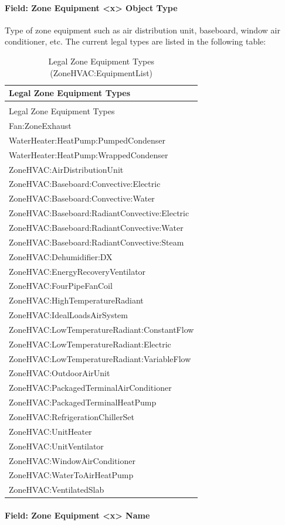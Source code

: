 \paragraph{Field: Zone Equipment \textless{}x\textgreater{} Object Type}\label{field-zone-equipment-x-object-type}

Type of zone equipment such as air distribution unit, baseboard, window air conditioner, etc. The current legal types are listed in the following table:

\begin{longtable}[c]{@{}l@{}}
\caption{Legal Zone Equipment Types (ZoneHVAC:EquipmentList) \label{table:legal-zone-equipment-types-zonehvac}} \tabularnewline
\toprule
Legal Zone Equipment Types \tabularnewline
\midrule
\endfirsthead

\caption[]{Legal Zone Equipment Types (ZoneHVAC:EquipmentList)} \tabularnewline
\toprule
Legal Zone Equipment Types \tabularnewline
\midrule
\endhead

Fan:ZoneExhaust \tabularnewline
WaterHeater:HeatPump:PumpedCondenser \tabularnewline
WaterHeater:HeatPump:WrappedCondenser \tabularnewline
ZoneHVAC:AirDistributionUnit \tabularnewline
ZoneHVAC:Baseboard:Convective:Electric \tabularnewline
ZoneHVAC:Baseboard:Convective:Water \tabularnewline
ZoneHVAC:Baseboard:RadiantConvective:Electric \tabularnewline
ZoneHVAC:Baseboard:RadiantConvective:Water \tabularnewline
ZoneHVAC:Baseboard:RadiantConvective:Steam \tabularnewline
ZoneHVAC:Dehumidifier:DX \tabularnewline
ZoneHVAC:EnergyRecoveryVentilator \tabularnewline
ZoneHVAC:FourPipeFanCoil \tabularnewline
ZoneHVAC:HighTemperatureRadiant \tabularnewline
ZoneHVAC:IdealLoadsAirSystem \tabularnewline
ZoneHVAC:LowTemperatureRadiant:ConstantFlow \tabularnewline
ZoneHVAC:LowTemperatureRadiant:Electric \tabularnewline
ZoneHVAC:LowTemperatureRadiant:VariableFlow \tabularnewline
ZoneHVAC:OutdoorAirUnit \tabularnewline
ZoneHVAC:PackagedTerminalAirConditioner \tabularnewline
ZoneHVAC:PackagedTerminalHeatPump \tabularnewline
ZoneHVAC:RefrigerationChillerSet \tabularnewline
ZoneHVAC:UnitHeater \tabularnewline
ZoneHVAC:UnitVentilator \tabularnewline
ZoneHVAC:WindowAirConditioner \tabularnewline
ZoneHVAC:WaterToAirHeatPump \tabularnewline
ZoneHVAC:VentilatedSlab \tabularnewline
\bottomrule
\end{longtable}

\paragraph{Field: Zone Equipment \textless{}x\textgreater{} Name}\label{field-zone-equipment-x-name}


